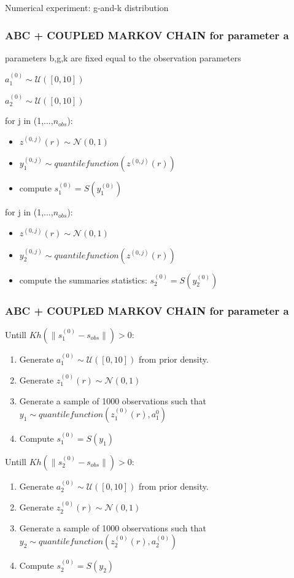 \documentclass{beamer}
\begin{document}
\begin{section}{Numerical experiment: g-and-k distribution}
\begin{frame}
\begin{enumerate}
	\end{enumerate} 
\end{frame}




\begin{frame}
	\frametitle{ABC + COUPLED MARKOV CHAIN for parameter a}
	
	parameters b,g,k are fixed equal to the observation parameters
	
	
	$ a_{1}^{(0)} \sim \mathcal{U}([0,10])$
	
	$ a_{2}^{(0)} \sim \mathcal{U}([0,10])$
	
	for j in (1,...,$n_{obs}$):
	\begin{itemize}
		\item $z^{(0,j)}(r) \sim \mathcal{N}(0,1)  $
		
		\item $ y_{1}^{(0,j)} \sim quantile function(z^{(0,j)}(r))$
		
		\item compute $ s_{1}^{(0)} =S(y_{1}^{(0)})$
	\end{itemize}
	for j in (1,...,$n_{obs}$):
	
	\begin{itemize}
		\item $z^{(0,j)}(r) \sim \mathcal{N}(0,1)  $
		
		\item $ y_{2}^{(0,j)} \sim quantile function(z^{(0,j)}(r))$
		
		\item compute the summaries statistics:
		$ s_{2}^{(0)} =S(y_{2}^{(0)})$
	\end{itemize}
	
\end{frame}
\begin{frame}
	\frametitle{ABC + COUPLED MARKOV CHAIN for parameter a}
	Untill $Kh(\|s_{1}^{(0)} - s_{obs}\|)>0$:
	\begin{enumerate}
		\item Generate $a_{1}^{(0)} \sim \mathcal{U}([0,10])$ from prior density.
		\item Generate $z_{1}^{(0)}(r) \sim \mathcal{N}(0,1)$
		\item Generate a sample of 1000 observations such that $y_{1} \sim quantile function(z_{1}^{(0)}(r),a_{1}^{0})$
		\item Compute $s_{1}^{(0)}=S(y_{1})$
		
	\end{enumerate}
	Untill $Kh(\|s_{2}^{(0)} - s_{obs}\|)>0$:
	\begin{enumerate}
		\item Generate $a_{2}^{(0)} \sim \mathcal{U}([0,10])$ from prior density.
		\item Generate $z_{2}^{(0)}(r) \sim \mathcal{N}(0,1)$
		\item Generate a sample of 1000 observations such that $y_{2} \sim quantile function(z_{2}^{(0)}(r),a_{2}^{(0)})$
		\item Compute $s_{2}^{(0)}=S(y_{2})$
	\end{enumerate}
	

\end{frame}
\end{section}
\end{document}
